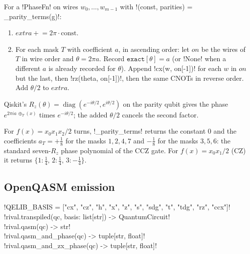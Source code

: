 \begin{algorithm}\label{alg:bench-tools-parity}
For a \py!PhaseFn! on wires $w_0,\ldots,w_{m-1}$ with \py!(const, parities) = _parity_terms(g)!:
\begin{enumerate}
\item $\mathit{extra}\mathrel{+}=2\pi\cdot\mathrm{const}$.
\item For each mask $T$ with coefficient $a$, in ascending order: let $\mathit{on}$ be the wires of $T$ in wire order and $\theta=2\pi a$. Record $\mathtt{exact}[\theta]=a$ (or \py!None! when a different $a$ is already recorded for $\theta$). Append \py!cx(w, on[-1])! for each $w$ in $\mathit{on}$ but the last, then \py!rz(theta, on[-1])!, then the same CNOTs in reverse order. Add $\theta/2$ to $\mathit{extra}$.
\end{enumerate}
Qiskit's $R_z(\theta)=\operatorname{diag}(e^{-i\theta/2},e^{i\theta/2})$ on the parity qubit gives the phase $e^{2\pi i a\,\oplus_T(x)}$ times $e^{-i\theta/2}$; the added $\theta/2$ cancels the second factor.
\end{algorithm}

\begin{example}\label{ex:bench-tools-ccz}
For $f(x)=x_0x_1x_2/2$ turns, \py!_parity_terms! returns the constant $0$ and the coefficients $a_T=+\tfrac18$ for the masks $1,2,4,7$ and $-\tfrac18$ for the masks $3,5,6$: the standard seven-$R_z$ phase polynomial of the CCZ gate. For $f(x)=x_0x_1/2$ (CZ) it returns $\{1:\tfrac14,\,2:\tfrac14,\,3:-\tfrac14\}$.
\end{example}

\subsection{OpenQASM emission}\label{sec:bench-tools-qasm}

\begin{signature}
\py!QELIB_BASIS = ["cx", "cz", "h", "x", "z", "s", "sdg", "t", "tdg", "rz", "ccx"]!\\
\py!rival.transpiled(qc, basis: list[str]) -> QuantumCircuit!\\
\py!rival.qasm(qc) -> str!\\
\py!rival.qasm_and_phase(qc) -> tuple[str, float]!\\
\py!rival.qasm_and_zx_phase(qc) -> tuple[str, float]!
\end{signature}

